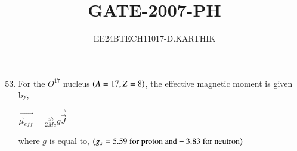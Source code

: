 \documentclass[journal]{IEEEtran}
\begin{document}

\vspace{3cm}

\title{GATE-2007-PH}
\author{EE24BTECH11017-D.KARTHIK}
\maketitle

\renewcommand{\thefigure}{\theenumi}
\renewcommand{\thetable}{\theenumi}
\setlength{\intextsep}{10pt}


\renewcommand{\thetable}{\theenumi}

\begin{enumerate}
    \setcounter{enumi}{52}
    \item For the $O^{17}$ nucleus $\left(A = 17, Z=8\right)$, the effective magnetic moment is given by, 
    
    \begin{center}
        
    
       $ \Vec{\overrightarrow{\mu}{_{eff}}} = \frac{eh}{2Mc}g\Vec{\overrightarrow{J}}$
    \end{center}
    where $g$ is equal to, $\left(g_s = 5.59 \text{ for proton and} -3.83 \text{ for neutron}\right)$
    \begin{multicols}{4}
    \begin{enumerate}
    

\end{enumerate}
\end{multicols}
\end{enumerate}
\end{document}
